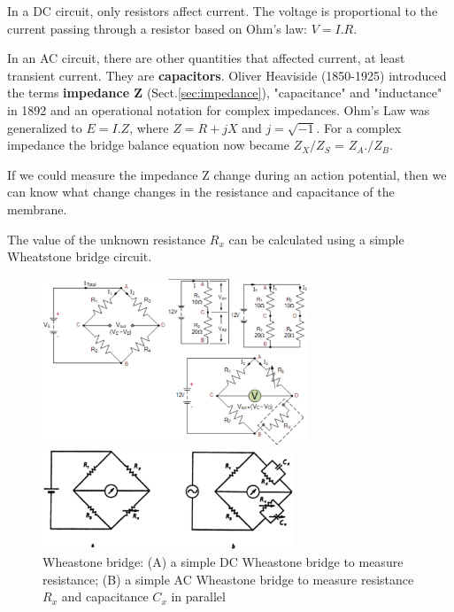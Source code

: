 \begin{mdframed}

In a DC circuit, only resistors affect current.
The voltage is proportional to the current passing through a resistor based on
Ohm's law: $V=I.R$.


In an AC circuit, there are other quantities  that  affected  current,  at least
 transient  current. They are {\bf capacitors}.
Oliver   Heaviside   (1850-1925)   introduced   the   terms   {\bf impedance Z}
(Sect.\ref{sec:impedance}), "capacitance"  and  "inductance"  in  1892  and  an 
operational  notation  for complex impedances.
Ohm's Law was generalized to $E = I.Z$, where $Z = R + jX$ and  $j=\sqrt{-1}$.
For  a  complex  impedance  the  bridge  balance  equation  now  became
$Z_X/Z_S$ =  $Z_A./Z_B$.


If we could measure the impedance Z change during an action potential, then we
can know what change changes in the resistance and capacitance of the membrane.

The value of the unknown resistance $R_x$ can be calculated using  a simple
Wheatstone bridge circuit. 
\end{mdframed}


\begin{figure}[hbt]
  \centerline{\includegraphics[height=5cm,
    angle=0]{./images/Wheatstone-bridge-2.eps}}
  \centerline{\includegraphics[height=3cm,
    angle=0]{./images/Wheastone-bridge.eps}}
\caption{Wheastone bridge: (A) a simple DC Wheastone bridge to measure
resistance; (B) a simple AC Wheastone bridge to measure resistance $R_x$ and
capacitance $C_x$ in parallel}
\label{fig:Wheastone-bridge}
\end{figure}


